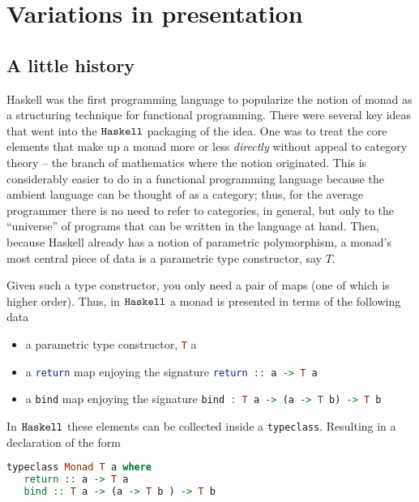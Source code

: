 \section{Variations in presentation}

\subsection{A little history}
Haskell was the first programming language to popularize the notion of
monad as a structuring technique for functional programming. There
were several key ideas that went into the $\texttt{Haskell}$ packaging of the
idea. One was to treat the core elements that make up a monad more or
less \emph{directly} without appeal to category theory -- the branch
of mathematics where the notion originated. This is considerably
easier to do in a functional programming language because the ambient
language can be thought of as a category; thus, for the average
programmer there is no need to refer to categories, in general, but
only to the ``universe'' of programs that can be written in the
language at hand. Then, because Haskell already has a notion of
parametric polymorphism, a monad's most central piece of data is a
parametric type constructor, say $T$.

Given such a type constructor, you only need a pair of maps (one of
which is higher order). Thus, in $\texttt{Haskell}$ a monad is presented in
terms of the following data

\begin{itemize}
  \item a parametric type constructor, \lstinline[language=Haskell]!T! a
  \item a \lstinline[language=Haskell]!return! map enjoying the
    signature \lstinline[language=Haskell]!return :: a -> T a!
  \item a \lstinline[language=Haskell]!bind! map enjoying the
    signature \lstinline[language=Haskell]!bind : T a -> (a -> T b) -> T b!
\end{itemize}

In $\texttt{Haskell}$ these elements can be collected inside a
\lstinline[language=Haskell]!typeclass!. Resulting in a declaration of
the form

\begin{lstlisting}[captionpos=b,language=Haskell,caption=monad typeclass]
  typeclass Monad T a where
   return :: a -> T a
   bind :: T a -> (a -> T b ) -> T b
\end{lstlisting}

